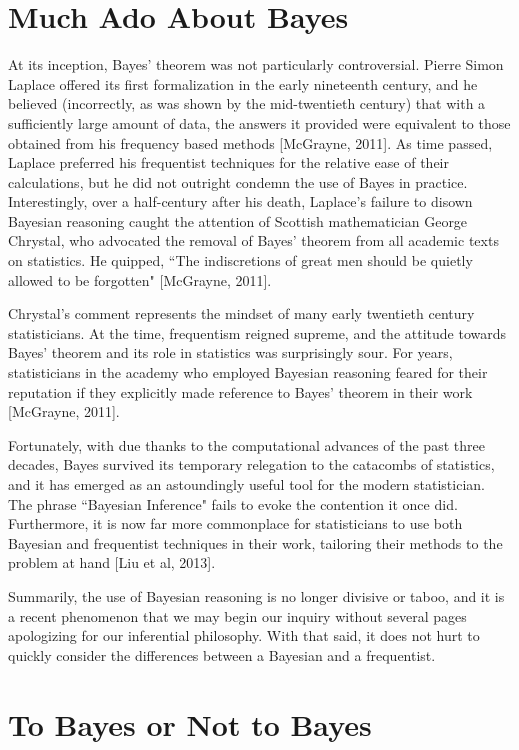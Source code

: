 \documentclass[12pt,twoside]{reedthesis}
\begin{document}
	\section{Much Ado About Bayes}
	At its inception, Bayes' theorem was not particularly controversial. Pierre Simon Laplace offered its first formalization in the early nineteenth century, and he believed (incorrectly, as was shown by the mid-twentieth century) that with a sufficiently large amount of data, the answers it provided were equivalent to those obtained from his frequency based methods [McGrayne, 2011]. 
	As time passed, Laplace preferred his frequentist techniques for the relative ease of their calculations, but he did not outright condemn the use of Bayes in practice. Interestingly, over a half-century after his death, Laplace's failure to disown Bayesian reasoning caught the attention of Scottish mathematician George Chrystal, who advocated the removal of Bayes' theorem from all academic texts on statistics. He quipped, ``The indiscretions of great men should be quietly allowed to be forgotten" [McGrayne, 2011].
	
	Chrystal's comment represents the mindset of many early twentieth century statisticians. At the time, frequentism reigned supreme, and the attitude towards Bayes' theorem and its role in statistics was surprisingly sour. For years, statisticians in the academy who employed Bayesian reasoning feared for their reputation if they explicitly made reference to Bayes' theorem in their work [McGrayne, 2011]. 
	
	Fortunately, with due thanks to the computational advances of the past three decades, Bayes survived its temporary relegation to the catacombs of statistics, and it has emerged as an astoundingly useful tool for the modern statistician. The phrase ``Bayesian Inference" fails to evoke the contention it once did. Furthermore, it is now far more commonplace for statisticians to use both Bayesian and frequentist techniques in their work, tailoring their methods to the problem at hand [Liu et al, 2013].
	
	Summarily, the use of Bayesian reasoning is no longer divisive or taboo, and it is a recent phenomenon that we may begin our inquiry without several pages apologizing for our inferential philosophy. With that said, it does not hurt to quickly consider the differences between a Bayesian and a frequentist. 
		
\section{To Bayes or Not to Bayes}
\end{document}
